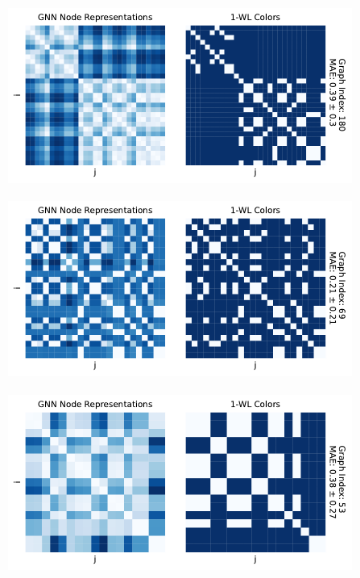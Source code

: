 \begin{figure}[!tbh]
	\centering
	\begin{subfigure}[b]{0.49\textwidth}
		\centering
		\includegraphics[width=\textwidth]{Figures/heatmaps_ENZYMES_single.pdf}
		\vspace*{-5ex} 
        \caption{\enzymes}
	\end{subfigure}
	\hfill
	\begin{subfigure}[b]{0.49\textwidth}
		\centering
		\includegraphics[width=\textwidth]{Figures/heatmaps_IMDB-BINARY_single.pdf}
		\vspace*{-5ex} 
        \caption{\imdb}
	\end{subfigure}
	\par\bigskip
	\begin{subfigure}[b]{0.49\textwidth}
		\centering
		\includegraphics[width=\textwidth]{Figures/heatmaps_MUTAG_single.pdf}

\end{subfigure}
\end{figure}
